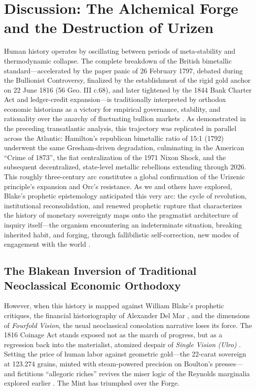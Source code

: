 \documentclass[
]{article}
\begin{document}
\newpage

\section{Discussion: The Alchemical Forge and the Destruction of
Urizen}\label{discussion-the-alchemical-forge-and-the-destruction-of-urizen}

Human history operates by oscillating between periods of meta-stability
and thermodynamic collapse. The complete breakdown of the British
bimetallic standard---accelerated by the paper panic of 26 February
1797, debated during the Bullionist Controversy, finalized by the
establishment of the rigid gold anchor on 22 June 1816 (56 Geo. III
c.68), and later tightened by the 1844 Bank Charter Act and
ledger-credit expansion---is traditionally interpreted by orthodox
economic historians as a victory for empirical governance, stability,
and rationality over the anarchy of fluctuating bullion markets
\citep{fetter1965development}. As demonstrated in the preceding
transatlantic analysis, this trajectory was replicated in parallel
across the Atlantic: Hamilton's republican bimetallic ratio of 15:1
(1792) underwent the same Gresham-driven degradation, culminating in the
American ``Crime of 1873'', the fiat centralization of the 1971 Nixon
Shock, and the subsequent decentralized, state-level metallic rebellions
extending through 2026. This roughly three-century arc constitutes a
global confirmation of the Urizenic principle's expansion and Orc's
resistance. As we and others have explored, Blake's prophetic
epistemology anticipated this very arc: the cycle of revolution,
institutional reconsolidation, and renewed prophetic rupture that
characterizes the history of monetary sovereignty maps onto the
pragmatist architecture of inquiry itself---the organism encountering an
indeterminate situation, breaking inherited habit, and forging, through
fallibilistic self-correction, new modes of engagement with the world
\citep{friedman2026blake, friedman2026doors, laughlin1898bimetallism, blake1793america}.

\subsection{The Blakean Inversion of Traditional Neoclassical Economic
Orthodoxy}\label{the-blakean-inversion-of-traditional-neoclassical-economic-orthodoxy}

However, when this history is mapped against William Blake's prophetic
critiques, the financial historiography of Alexander Del Mar
\citep{delmar1895history}, and the dimensions of \emph{Fourfold Vision},
the usual neoclassical consolation narrative loses its force. The 1816
Coinage Act stands exposed not as the march of progress, but as a
regression back into the materialist, atomized despair of \emph{Single
Vision (Ulro)} \citep{redish1990evolution}. Setting the price of human
labor against geometric gold---the 22-carat sovereign at 123.274 grains,
minted with steam-powered precision on Boulton's presses---and
fictitious ``allegoric riches'' revives the miser logic of the Reynolds
marginalia explored earlier \citep{blake1808annotations}. The Mint has
triumphed over the Forge.
\end{document}
